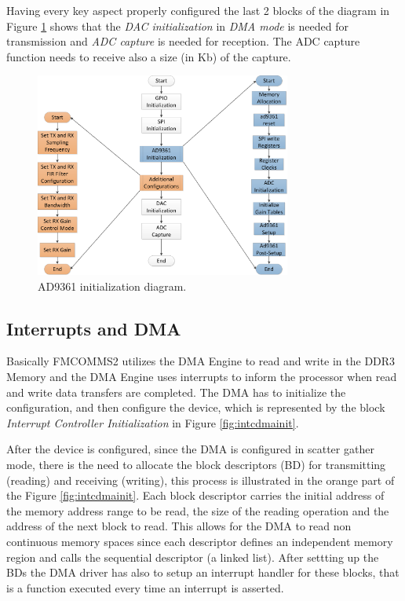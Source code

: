 Having every key aspect properly configured the last 2 blocks of the diagram in
Figure \ref{fig:ad9361init} shows that the \emph{DAC initialization} in
\textit{DMA mode} is needed for transmission and \emph{ADC capture} is needed
for reception. The ADC capture function needs to receive also a size (in Kb) of
the capture.


\begin{figure}[htbp]
    \centering
    \includegraphics[width=0.75\textwidth]{./figures/ad9361_driver}
    \caption{ AD9361 initialization diagram.
    \label{fig:ad9361init}}
\end{figure}

\subsection{Interrupts and DMA}

Basically FMCOMMS2 utilizes the DMA Engine to read and write in the DDR3 Memory
and the DMA Engine uses interrupts to inform the processor when read and write
data transfers are completed. The DMA has to initialize the configuration, and
then configure the device, which is represented by the block \emph{Interrupt
Controller Initialization} in Figure \ref{fig:intcdmainit}.

After the device is configured, since the DMA is configured in scatter gather
mode, there is the need to allocate the block descriptors (BD) for transmitting
(reading) and receiving (writing), this process is illustrated in the orange
part of the Figure \ref{fig:intcdmainit}. Each block descriptor carries the
initial address of the memory address range to be read, the size of the reading
operation and the address of the next block to read. This allows for the DMA to
read non continuous memory spaces since each descriptor defines an independent
memory region and calls the sequential descriptor (a linked list). After
settting up the BDs the DMA driver has also to setup an interrupt handler for
these blocks, that is a function executed every time an interrupt is asserted.

